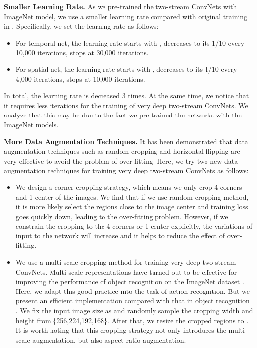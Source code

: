 \documentclass[10pt,twocolumn,letterpaper]{article}
\begin{document}
\textbf{Smaller Learning Rate.} As we pre-trained the two-stream ConvNets with ImageNet model, we use a smaller learning rate compared with original training in \cite{SimonyanZ14}. Specifically, we set the learning rate as follows:
\begin{itemize}
  \item For temporal net, the learning rate starts with , decreases to its 1/10 every 10,000 iterations, stops at 30,000 iterations.
  \item For spatial net, the learning rate starts with , decreases to its 1/10 every 4,000 iterations, stops at 10,000 iterations.
\end{itemize}
In total, the learning rate is decreased 3 times. At the same time, we notice that it requires less iterations for the training of very deep two-stream ConvNets. We analyze that this may be due to the fact we pre-trained the networks with the ImageNet models.

\textbf{More Data Augmentation Techniques.} It has been demonstrated that data augmentation techniques such as random cropping and horizontal flipping are very effective to avoid the problem of over-fitting. Here, we try two new data augmentation techniques for training very deep two-stream ConvNets as follows:
\begin{itemize}
  \item We design a corner cropping strategy, which means we only crop 4 corners and 1 center of the images. We find that if we use random cropping method, it is more likely select the regions close to the image center and training loss goes quickly down, leading to the over-fitting problem. However, if we constrain the cropping to the 4 corners or 1 center explicitly, the variations of input to the network will increase and it helps to reduce the effect of over-fitting.
  \item We use a multi-scale cropping method for training very deep two-stream ConvNets. Multi-scale representations have turned out to be effective for improving the performance of object recognition on the ImageNet dataset \cite{SimonyanZ14a}. Here, we adapt this good practice into the task of action recognition. But we present an efficient implementation compared with that in object recognition \cite{SimonyanZ14a}. We fix the input image size as  and randomly sample the cropping width and height from \{256,224,192,168\}. After that, we resize the cropped regions to . It is worth noting that this cropping strategy not only introduces the multi-scale augmentation, but also aspect ratio augmentation.
\end{itemize}
\end{document}
